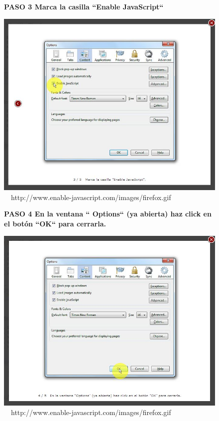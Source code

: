 \documentclass[11pt]{article} %
\begin{document}
\begin{figure}
\begin{center}

\begin{center}
\bf PASO 3
Marca la casilla ``Enable JavaScript``
\newline
\end{center}
\includegraphics[height=8 cm, width=8 cm] {imagenes/firefox 03.JPG}
\newline
\newline
\ 
\  {http://www.enable-javascript.com/images/firefox.gif }

\begin{center}
\bf PASO 4
En la ventana `` Options`` (ya abierta) haz click en el botón ``OK`` para cerrarla.
\end{center}
\includegraphics[height=8 cm, width=8 cm] {imagenes/firefox 04.JPG}
\newline
\newline
\ 
\  {http://www.enable-javascript.com/images/firefox.gif }

\end{center}
\end{figure}
\end{document}
